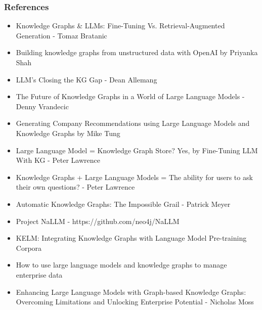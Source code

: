 \begin{frame}[fragile]\frametitle{References}
\begin{itemize}
\item Knowledge Graphs \& LLMs: Fine-Tuning Vs. Retrieval-Augmented Generation - Tomaz Bratanic
\item Building knowledge graphs from unstructured data with OpenAI by Priyanka Shah
\item LLM’s Closing the KG Gap - Dean Allemang
\item The Future of Knowledge Graphs in a World of Large Language Models - Denny Vrandecic
\item Generating Company Recommendations using Large Language Models and Knowledge Graphs by Mike Tung
\item Large Language Model = Knowledge Graph Store? Yes, by Fine-Tuning LLM With KG - Peter Lawrence
\item Knowledge Graphs + Large Language Models = The ability for users to ask their own questions? - Peter Lawrence
\item Automatic Knowledge Graphs: The Impossible Grail - Patrick Meyer
\item Project NaLLM - https://github.com/neo4j/NaLLM
\item KELM: Integrating Knowledge Graphs with Language Model Pre-training Corpora 
\item How to use large language models and knowledge graphs to manage enterprise data 
\item Enhancing Large Language Models with Graph-based Knowledge Graphs: Overcoming Limitations and Unlocking Enterprise Potential - Nicholas Moss
\end{itemize}
\end{frame}
